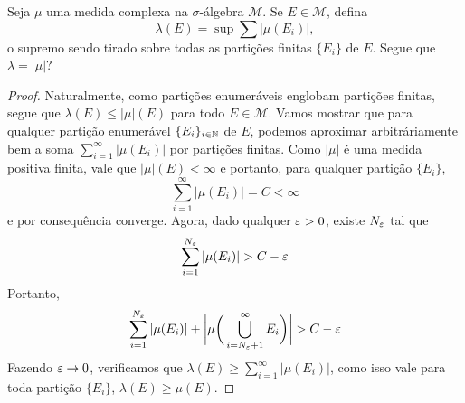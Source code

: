\begin{problem}
    \label{prob:l6:5}
    Seja $\mu$ uma medida complexa na $\sigma$-álgebra $\mathcal{M}$. Se $E \in \mathcal{M}$, defina
    $$\lambda(E) = \sup \sum |\mu(E_i)|,$$
    o supremo sendo tirado sobre todas as partições finitas $\{E_i\}$ de $E$. Segue que $\lambda = |\mu|$?
\end{problem}
\begin{proof}
    Naturalmente, como partições enumeráveis englobam partições finitas, segue que $\lambda(E) \leq |\mu|(E)$ para todo $E \in \mathcal{M}$.
    Vamos mostrar que para qualquer partição enumerável $\{E_i\}_{i \in \mathbb{N}}$ de $E$, podemos aproximar arbitráriamente bem a soma 
    $\sum_{i=1}^{\infty} |\mu(E_i)|$ por partições finitas. Como $|\mu|$ é uma medida positiva finita, vale que $|\mu|(E) < \infty$
    e portanto, para qualquer partição $\{E_i\}$,
    $$\sum_{i=1}^{\infty} |\mu(E_i)| = C < \infty$$
    e por consequência converge. Agora, dado qualquer $\varepsilon > 0$, existe $N_\varepsilon$ tal que 
    $$\sum_{i=1}^{N_\varepsilon} |\mu(E_i)| > C - \varepsilon$$
    Portanto,
    $$\sum_{i=1}^{N_\varepsilon} |\mu(E_i)| + \bigg|\mu\bigg(\bigcup_{i = N_\varepsilon + 1}^\infty E_i\bigg)\bigg| > C - \varepsilon$$
    Fazendo $\varepsilon \rightarrow 0$, verificamos que $\lambda(E) \geq \sum_{i=1}^{\infty} |\mu(E_i)|$, como isso vale para toda partição $\{E_i\}$,
    $\lambda(E) \geq \mu(E)$.
\end{proof}

